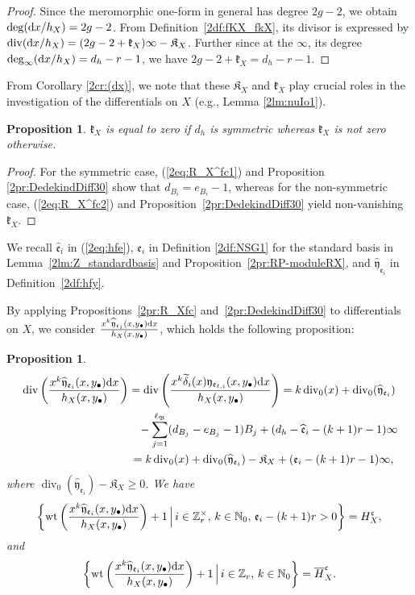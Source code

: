 \documentclass[10pt,a4paper]{amsart}
\def\ZZ{{\mathbb Z}}
\def\NN{{\mathbb N}}
\def\fB{{\mathfrak B}}
\def\fK{{\mathfrak K}}
\def\fc{{\mathfrak c}}
\def\fe{{\mathfrak e}}
\def\fk{{\mathfrak k}}
\def\fy{{\mathfrak y}}
\def\tdelta{{\widetilde \delta}}
\def\BH{{\overline H}}
\def\hfe{{\widehat{\mathfrak e}}}
\def\hfy{{\widehat{\mathfrak y}}}
\def\Div{\operatorname{div}}
\def\wt{{\mathrm {wt}}}
\numberwithin{equation}{section}
\newtheorem{Proposition}[Theorem]{Proposition}
 { \theoremstyle{definition}
\newtheorem{Definition}[Theorem]{Definition}
\newtheorem{Note}[Theorem]{Note}
\newtheorem{Example}[Theorem]{Example}
\newtheorem{Remark}[Theorem]{Remark} }
\begin{document}
\begin{proof}
Since the meromorphic one-form in general has degree $2g-2$, we obtain $\deg({\rm d} x/h_X)=2g-2$. From Definition~\ref{2df:fKX_fkX}, its divisor is expressed by $\Div({\rm d} x/h_X)=(2g-2+\fk_X)\infty-\fK_X$.
Further since at the $\infty$, its degree $\deg_\infty({\rm d} x/h_X)=d_h - r-1$, we have $2g-2+\fk_X=d_h - r- 1$.
\end{proof}

From Corollary \ref{2cr:(dx)}, we note that these $\fK_X$ and $\fk_X$ play crucial roles in the investigation of the differentials on $X$ (e.g., Lemma \ref{2lm:nuIo1}).

\begin{Proposition}\label{2pr:fK_X}
$\fk_X$ is equal to zero if $d_h$ is symmetric whereas $\fk_X$ is not zero otherwise.
\end{Proposition}

\begin{proof}
For the symmetric case, (\ref{2eq:R_X^fc1}) and Proposition \ref{2pr:DedekindDiff30} show that $d_{B_i}=e_{B_i}-1$, whereas for the non-symmetric case, (\ref{2eq:R_X^fc2}) and Proposition~\ref{2pr:DedekindDiff30} yield non-vanishing $\fk_X$.
\end{proof}

We recall $\hfe_i$ in (\ref{2eq:hfe}), $\fe_i$ in Definition \ref{2df:NSG1} for the standard basis in Lemma~\ref{2lm:Z_standardbasis} and Proposition~\ref{2pr:RP-moduleRX}, and $\hfy_{\fe_i}$ in Definition~\ref{2df:hfy}.

By applying Propositions~\ref{2pr:R_Xfc} and~\ref{2pr:DedekindDiff30} to differentials on $X$, we consider $\frac{x^k \hfy_{\fe_i}(x,y_\bullet) {\rm d} x}{h_X(x,y_\bullet)}$, which holds the following proposition:

\begin{Proposition}\label{2pr:phi_hi}
\begin{gather*}
\Div\left(\frac{x^k \hfy_{\fe_i}(x,y_\bullet) {\rm d} x}
 {h_X(x,y_\bullet)}\right)
= \Div\left(\frac{x^k \tdelta_i(x)\fy_{\fe_{\ell,i}}(x,y_\bullet) {\rm d} x}
 {h_X(x,y_\bullet)}\right)=k\Div_0(x)+\Div_0(\hfy_{\fe_i})
\\
\hphantom{\Div\left(\frac{x^k \hfy_{\fe_i}(x,y_\bullet) {\rm d} x}
 {h_X(x,y_\bullet)}\right)=}{}
-\sum_{j=1}^{\ell_{\fB}} (d_{B_j}-e_{B_j} -1) B_j
+(d_h - \hfe_{i}-(k+1)r-1) \infty\\
\hphantom{\Div\left(\frac{x^k \hfy_{\fe_i}(x,y_\bullet) {\rm d} x}
 {h_X(x,y_\bullet)}\right)}{}
=k\Div_0(x)+\Div_0(\hfy_{\fe_i})-\fK_X+(\fe_{i}-(k+1)r-1) \infty,
\end{gather*}
where $\Div_0(\hfy_{\fe_i})-\fK_X\ge0$.
We have
\[
\left\{
\wt
\left(\frac{x^k \hfy_{\fe_i}(x,y_\bullet) {\rm d} x}{h_X(x,y_\bullet)}\right)+1 \,
\Bigr| \, i \in \ZZ_r^\times,\, k\in \NN_0,\, \fe_{i}-(k+1)r>0\right\}
=H_X^\fc,
\]
and
\[
\left\{
\wt
\left(\frac{x^k \hfy_{\fe_i}(x,y_\bullet) {\rm d} x}{h_X(x,y_\bullet)}\right)+1 \,
\Bigr| \, i \in \ZZ_r,\, k\in \NN_0\right\}
=\BH_X^\fc.
\]
\end{Proposition}
\end{document}

